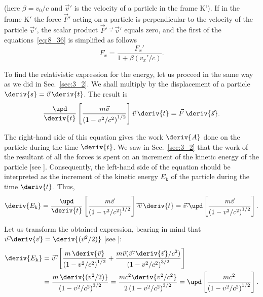 \noindent
(here $\beta=v_0/c$ and $\vec{v}'$ is the velocity of a particle in the frame K'). If in the frame K$'$ the force $\vec{F}'$ acting on a particle is perpendicular to the velocity of the particle $\vec{v}'$, the scalar product $\vec{F}'\vec{\cdot}\vec{v}'$ equals zero, and the first of the equations~\eqref{eq:8_36} is simplified as follows
\begin{equation}\label{eq:8_37}
	F_x = \frac{F_x'}{1 + \beta(v_x'/c)}.
\end{equation}

\noindent
To find the relativistic expression for the energy, let us proceed in the same way as we did in Sec.~\ref{sec:3_2}. We shall multiply  by the displacement of a particle $\deriv{s}=\vec{v}\,\deriv{t}$. The result is
\begin{equation*}
	\frac{\upd}{\deriv{t}}\left[\frac{m\vec{v}}{\left(1-v^2/c^2\right)^{1/2}}\right]\vec{v}\,\deriv{t} = \vec{F}\,\deriv{\vec{s}}.
\end{equation*}

\noindent
The right-hand side of this equation gives the work $\deriv{A}$ done on the particle during the time $\deriv{t}$. We saw in Sec.~\ref{sec:3_2} that the work of the resultant of all the forces is spent on an increment of the kinetic energy of the particle [see ]. Consequently, the left-hand side of the equation should be interpreted as the increment of the kinetic energy $E_{\text{k}}$ of the particle during the time $\deriv{t}$. Thus,
\begin{equation*}
	\deriv{E_{\text{k}}} = \frac{\upd}{\deriv{t}}\left[\frac{m\vec{v}}{\left(1-v^2/c^2\right)^{1/2}}\right]\vec{\cdot}\vec{v}\,\deriv{t} = \vec{v}\vec{\cdot} \upd\left[\frac{m\vec{v}}{\left(1-v^2/c^2\right)^{1/2}}\right].
\end{equation*}

Let us transform the obtained expression, bearing in mind that $\vec{v}\vec{\cdot}\deriv{\vec{v}}=\deriv{(\vec{v}^2/2)}$ [see ]:
\begin{align*}
	\deriv{E_{\text{k}}} &= \vec{v}\vec{\cdot} \left[\frac{m\,\deriv{\vec{v}}}{\left(1-v^2/c^2\right)^{1/2}} +  \frac{m\vec{v}(\vec{v}\vec{\cdot}\,\deriv{\vec{v}}/c^2)}{\left(1-v^2/c^2\right)^{3/2}}\right]\\
	& = \frac{m\,\deriv{(v^2/2)}}{\left(1-v^2/c^2\right)^{3/2}} = \frac{mc^2\deriv{v^2/c^2}}{2\left(1-v^2/c^2\right)^{3/2}} = \upd\left[\frac{mc^2}{\left(1-v^2/c^2\right)^{1/2}}\right].
\end{align*}

